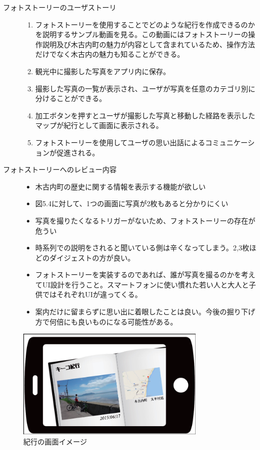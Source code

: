 \begin{description}
 \item[フォトストーリーのユーザストーリ]\mbox{}
 \begin{enumerate}
 \item フォトストーリーを使用することでどのような紀行を作成できるのかを説明するサンプル動画を見る。この動画にはフォトストーリーの操作説明及び木古内町の魅力が内容として含まれているため、操作方法だけでなく木古内の魅力も知ることができる。
  \item 観光中に撮影した写真をアプリ内に保存。
 \item 撮影した写真の一覧が表示され、ユーザが写真を任意のカテゴリ別に分けることができる。
 \item 加工ボタンを押すとユーザが撮影した写真と移動した経路を表示したマップが紀行として画面に表示される。
 \item フォトストーリーを使用してユーザの思い出話によるコミュニケーションが促進される。
\end{enumerate}
\item[フォトストーリーへのレビュー内容]\mbox{}
 \begin{itemize}
 \item 木古内町の歴史に関する情報を表示する機能が欲しい
 \item 図5.4に対して、1つの画面に写真が2枚もあると分かりにくい
 \item 写真を撮りたくなるトリガーがないため、フォトストーリーの存在が危うい
 \item 時系列での説明をされると聞いている側は辛くなってしまう。2,3枚ほどのダイジェストの方が良い。
 \item フォトストーリーを実装するのであれば、誰が写真を撮るのかを考えてUI設計を行うこと。スマートフォンに使い慣れた若い人と大人と子供ではそれぞれUIが違ってくる。
 \item 案内だけに留まらずに思い出に着眼したことは良い。今後の掘り下げ方で何倍にも良いものになる可能性がある。
 \end{itemize}
\end{description}

\begin{figure}[htbp]
 \begin{center}
\includegraphics[width=9cm, bb=0 0 857 498]{5.1_kikou.png}
 \end{center}
\addtocounter{figure}{+0}
 \caption{紀行の画面イメージ}
 \label{fig:one}
\end{figure}
